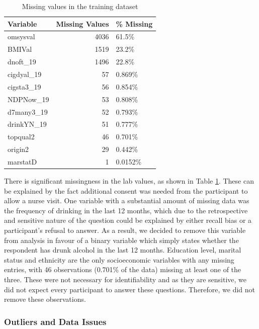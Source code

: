 \documentclass[
  11pt,
  twocolumn]{article}
\begin{document}
\begin{table}

\caption{\label{tab:outputnatable}Missing values in the training dataset\label{tab:output-na-table}}
\centering
\fontsize{9}{11}\selectfont
\begin{tabular}[t]{l|r|l}
\hline
\textbf{Variable} & \textbf{Missing Values} & \textbf{\% Missing}\\
\hline
omsysval & 4036 & 61.5\%\\
\hline
BMIVal & 1519 & 23.2\%\\
\hline
dnoft\_19 & 1496 & 22.8\%\\
\hline
cigdyal\_19 & 57 & 0.869\%\\
\hline
cigsta3\_19 & 56 & 0.854\%\\
\hline
NDPNow\_19 & 53 & 0.808\%\\
\hline
d7many3\_19 & 52 & 0.793\%\\
\hline
drinkYN\_19 & 51 & 0.777\%\\
\hline
topqual2 & 46 & 0.701\%\\
\hline
origin2 & 29 & 0.442\%\\
\hline
marstatD & 1 & 0.0152\%\\
\hline
\end{tabular}
\end{table}

There is significant missingness in the lab values, as shown in Table
\ref{tab:output-na-table}. These can be explained by the fact additional
consent was needed from the participant to allow a nurse visit. One
variable with a substantial amount of missing data was the frequency of
drinking in the last 12 months, which due to the retrospective and
sensitive nature of the question could be explained by either recall
bias or a participant's refusal to answer. As a result, we decided to
remove this variable from analysis in favour of a binary variable which
simply states whether the respondent has drunk alcohol in the last 12
months. Education level, marital status and ethnicity are the only
socioeconomic variables with any missing entries, with 46 observations
(0.701\% of the data) missing at least one of the three. These were not
necessary for identifiability and as they are sensitive, we did not
expect every participant to answer these questions. Therefore, we did
not remove these observations.

\hypertarget{outliers-and-data-issues}{%
\subsubsection{Outliers and Data
Issues}\label{outliers-and-data-issues}}
\end{document}
